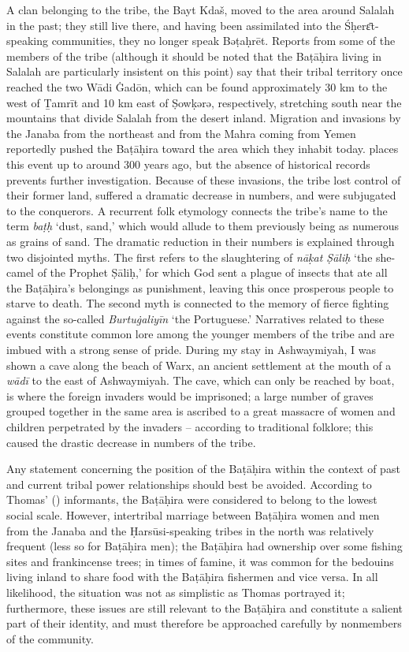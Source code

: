 \documentclass[output=paper]{langscibook}
\begin{document}
A clan belonging to the tribe, the Bayt Kdaš, moved to the area around Salalah in the past; they still live there, and having been assimilated into the Śḥerɛ̄t-speaking communities, they no longer speak Bəṭaḥrēt. 
Reports from some of the members of the tribe (although it should be noted that the Baṭāḥira living in Salalah are particularly insistent on this point) say that their tribal territory once reached the two Wādi Ġadōn, which can be found approximately 30 km to the west of Ṯamrīt and 10 km east of Ṣowḳǝrǝ, respectively, stretching south near the mountains that divide Salalah from the desert inland. Migration and invasions by the Janaba from the northeast and from the Mahra coming from Yemen reportedly pushed the Baṭāḥira toward the area which they inhabit today. \citet[54–55]{altabuki_tribal_1982} places this event up to around 300 years ago, but the absence of historical records prevents further investigation. Because of these invasions, the tribe lost control of their former land, suffered a dramatic decrease in numbers, and were subjugated to the conquerors. A recurrent folk etymology connects the tribe’s name to the term \textit{baṭḥ} ‘dust, sand,’ which would allude to them previously being as numerous as grains of sand. The dramatic reduction in their numbers is explained through two disjointed myths. The first refers to the slaughtering of \textit{nāḳat Ṣāliḥ} ‘the she-camel of the Prophet Ṣāliḥ,’ for which God sent a plague of insects that ate all the Baṭāḥira’s belongings as punishment, leaving this once prosperous people to starve to death. The second myth is connected to the memory of fierce fighting against the so-called \textit{Burtuġaliyīn} ‘the Portuguese.’ Narratives related to these events constitute common lore among the younger members of the tribe and are imbued with a strong sense of pride. During my stay in Ashwaymiyah, I was shown a cave along the beach of Warx, an ancient settlement at the mouth of a \textit{wādī} to the east of Ashwaymiyah. The cave, which can only be reached by boat, is where the foreign invaders would be imprisoned; a large number of graves grouped together in the same area is ascribed to a great massacre of women and children perpetrated by the invaders – according to traditional folklore; this caused the drastic decrease in numbers of the tribe.

Any statement concerning the position of the Baṭāḥira within the context of past and current tribal power relationships should best be avoided. According to Thomas’ (\citeyear{thomas_among_1929}) informants, the Baṭāḥira were considered to belong to the lowest social scale. However, intertribal marriage between Baṭāḥira women and men from the Janaba and the Ḥarsūsi-speaking tribes in the north was relatively frequent (less so for Baṭāḥira men); the Baṭāḥira had ownership over some fishing sites and frankincense trees; in times of famine, it was common for the bedouins living inland to share food with the Baṭāḥira fishermen and vice versa. In all likelihood, the situation was not as simplistic as Thomas portrayed it; furthermore, these issues are still relevant to the Baṭāḥira and constitute a salient part of their identity, and must therefore be approached carefully by nonmembers of the community.
\end{document}
